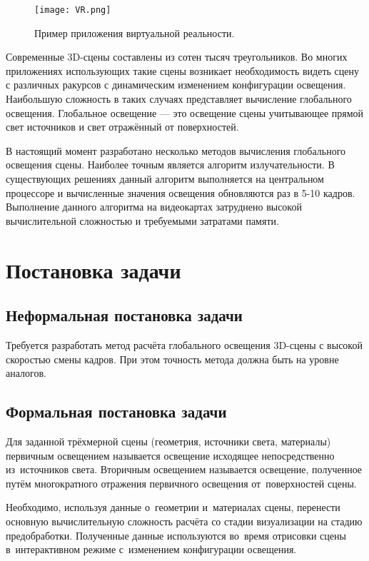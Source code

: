 \documentclass[12pt,fleqn]{article}
\begin{document}
\begin{figure}[htb]
    \centering
    \texttt{[image: VR.png]}
    \caption{Пример приложения виртуальной реальности.}
    \label{VR}
\end{figure}

Современные 3D-сцены составлены из сотен тысяч треугольников. Во многих приложениях использующих такие сцены возникает необходимость видеть сцену с различных ракурсов с динамическим изменением конфигурации освещения. Наибольшую сложность в таких случаях представляет вычисление глобального освещения. Глобальное освещение --- это освещение сцены учитывающее прямой свет источников и свет отражённый от поверхностей.

В настоящий момент разработано несколько методов вычисления глобального освещения сцены. Наиболее точным является алгоритм излучательности. В существующих решениях данный алгоритм выполняется на центральном процессоре и вычисленные значения освещения обновляются раз в 5-10 кадров. Выполнение данного алгоритма на видеокартах затруднено высокой вычислительной сложностью и требуемыми затратами памяти.

\pagebreak

\section{Постановка задачи}

\subsection{Неформальная постановка задачи}

Требуется разработать метод расчёта глобального освещения 3D-сцены с высокой скоростью смены кадров. При этом точность метода должна быть на уровне аналогов.

\subsection{Формальная постановка задачи}

Для заданной трёхмерной сцены (геометрия, источники света, материалы) первичным освещением называется освещение исходящее непосредственно из~источников света. Вторичным освещением называется освещение, полученное путём многократного отражения первичного освещения от~поверхностей сцены.

Необходимо, используя данные о~геометрии и~материалах сцены, перенести основную вычислительную сложность расчёта со стадии визуализации на стадию предобработки. Полученные данные используются во~время отрисовки сцены в~интерактивном режиме с~изменением конфигурации освещения.
\end{document}
